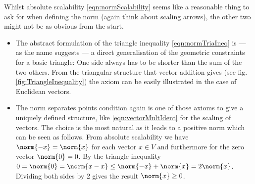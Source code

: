 \begin{rem}
	Whilst absolute scalability \eqref{eqn:normScalability} seems like a reasonable thing to ask for when defining the norm (again think about scaling arrows), the other two might not be as obvious from the start.
	\begin{itemize}
		\item The abstract formulation of the triangle inequality \eqref{eqn:normTriaIneq} is --- as the name suggests --- a direct generalisation of the geometric constraints for a basic triangle:
			One side always has to be shorter than the sum of the two others. 
			From the triangular structure that vector addition gives (see fig. \vref{fig:TriangleInequality}) the axiom can be easily illustrated in the case of Euclidean vectors.
		\item The norm separates points condition again is one of those axioms to give a uniquely defined structure, like \eqref{eqn:vectorMultIdent} for the scaling of vectors.
			The choice is the most natural as it leads to a positive norm which can be seen as follows.
			From absolute scalability we have $\norm{-x} = \norm{x}$ for each vector $x \in V$ and furthermore for the zero vector $\norm{0} = 0$.
			By the triangle inequality $0 = \norm{0} = \norm{x-x} \le \norm{-x} + \norm{x} = 2 \norm{x}$. 
			Dividing both sides by 2 gives the result $\norm{x} \ge 0$.
	\end{itemize}
\end{rem}


